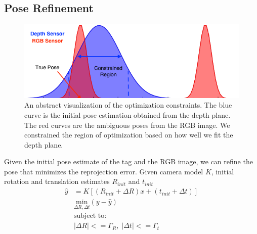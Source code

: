 \subsection{Pose Refinement}
\begin{figure}
\centering
\includegraphics[width=\columnwidth]{figs/optimization_visualization_fig}
\caption{An abstract visualization of the optimization constraints. The blue curve is the initial pose estimation obtained from the depth plane. The red curves are the ambiguous poses from the RGB image. We constrained the region of optimization based on how well we fit the depth plane.}
\label{fig:calib}
\end{figure}
Given the initial pose estimate of the tag and the RGB image, we can refine the pose that minimizes the reprojection error. Given camera model $K$, initial rotation and translation estimates $R_{init}$ and $t_{init}$
\begin{align*}
\hat{y} &= K[(R_{init} + \Delta R)x + (t_{init} + \Delta t)]\\
&\underset{\Delta R, \Delta t}{\mathrm{min}} (y - \hat{y})\\
&\text{subject to:} \\
& |\Delta R| <= \Gamma_R, \; |\Delta t| <= \Gamma_t\\
\end{align*}
